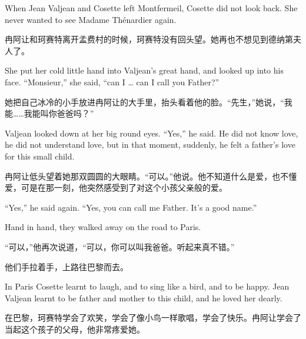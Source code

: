 \documentclass[fontset=ubuntu, zihao=5]{ctexart}
\begin{document}
\begin{paracol}{2}
  \switchcolumn*

  \sectionbreak

  When Jean Valjean and Cosette left Montfermeil, Cosette did not look back. She never wanted to see Madame Thénardier again.

  \switchcolumn

  \sectionbreak

  冉阿让和珂赛特离开孟费村的时候，珂赛特没有回头望。她再也不想见到德纳第夫人了。

  \switchcolumn*

  She put her cold little hand into Valjean's great hand, and looked up into his face. ``Monsieur,'' she said, ``can I \ldots{} can I call you Father?''

  \switchcolumn

  她把自己冰冷的小手放进冉阿让的大手里，抬头看着他的脸。“先生，”她说，“我能……我能叫你爸爸吗？”

  \switchcolumn*

  Valjean looked down at her big round eyes. ``Yes,'' he said. He did not know love, he did not understand love, but in that moment, suddenly, he felt a father's love for this small child.

  \switchcolumn

  冉阿让低头望着她那双圆圆的大眼睛。“可以。”他说。他不知道什么是爱，也不懂爱，可是在那一刻，他突然感受到了对这个小孩父亲般的爱。

  \switchcolumn*

  ``Yes,'' he said again. ``Yes, you can call me Father. It's a good name.''


  Hand in hand, they walked away on the road to Paris.

  \switchcolumn

  “可以，”他再次说道，“可以，你可以叫我爸爸。听起来真不错。”

  他们手拉着手，上路往巴黎而去。

  \switchcolumn*

  \sectionbreak

  In Paris Cosette learnt to laugh, and to sing like a bird, and to be happy. Jean Valjean learnt to be father and mother to this child, and he loved her dearly.

  \switchcolumn

  \sectionbreak

  在巴黎，珂赛特学会了欢笑，学会了像小鸟一样歌唱，学会了快乐。冉阿让学会了当起这个孩子的父母，他非常疼爱她。

  \switchcolumn*


\end{paracol}
\end{document}
